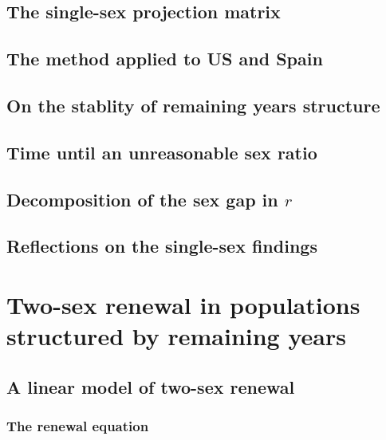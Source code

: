     \section{The single-sex projection matrix}
      

    \section{The method applied to US and Spain}
      

    \section{On the stablity of remaining years structure}
      
      
    \section{Time until an unreasonable sex ratio}
      
      
    \section{Decomposition of the sex gap in $r$}
      
      
    \section{Reflections on the single-sex findings}
      
\chapter{Two-sex renewal in populations structured by remaining years}
  
  
  \section{A linear model of two-sex renewal}
    
    
    \subsection{The renewal equation}
      
      
